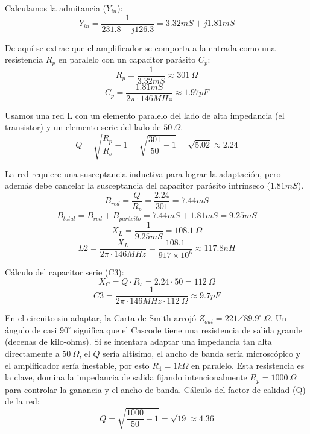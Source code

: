 \documentclass[11pt,a4paper,twoside]{report}
\begin{document}
	Calculamos la admitancia ($Y_{in}$):
	\begin{equation}
		Y_{in} = \frac{1}{231.8 - j126.3} = 3.32mS + j1.81mS
	\end{equation}
	
	De aquí se extrae que el amplificador se comporta a la entrada como una resistencia $R_p$ en paralelo con un capacitor parásito $C_p$:
	\begin{equation}
		R_p = \frac{1}{3.32mS} \approx 301 \ \Omega
	\end{equation}
	\begin{equation}
		C_p = \frac{1.81mS}{2 \pi \cdot 146 MHz} \approx 1.97 pF
	\end{equation}\newpage
	
	Usamos una red L con un elemento paralelo del lado de alta impedancia (el transistor) y un elemento serie del lado de $50 \ \Omega$.
	\begin{equation}
		Q = \sqrt{\frac{R_p}{R_s} - 1} = \sqrt{\frac{301}{50} - 1} = \sqrt{5.02} \approx 2.24
	\end{equation}
	
	La red requiere una susceptancia inductiva para lograr la adaptación, pero además debe cancelar la susceptancia del capacitor parásito intrínseco ($1.81 mS$).
	\begin{equation}
		B_{red} = \frac{Q}{R_p} = \frac{2.24}{301} = 7.44 mS
	\end{equation}
	\begin{equation}
		B_{total} = B_{red} + B_{parásito} = 7.44mS + 1.81 mS = 9.25mS
	\end{equation}
	\begin{equation}
		X_L = \frac{1}{9.25 mS} = 108.1 \ \Omega
	\end{equation}
	\begin{equation}
		L2 = \frac{X_L}{2 \pi \cdot 146MHz} = \frac{108.1}{917 \times 10^6} \approx 117.8 nH
	\end{equation}
	
	Cálculo del capacitor serie (C3):
	\begin{equation}
		X_C = Q \cdot R_s = 2.24 \cdot 50 = 112 \ \Omega
	\end{equation}
	\begin{equation}
		C3 = \frac{1}{2 \pi \cdot 146MHz \cdot 112 \ \Omega} \approx 9.7 pF
	\end{equation}
	
	En el circuito sin adaptar, la Carta de Smith arrojó $Z_{out} = 221 \angle 89.9^\circ \ \Omega$. Un ángulo de casi $90^\circ$ significa que el Cascode tiene una resistencia de salida grande (decenas de kilo-ohms). Si se intentara adaptar una impedancia tan alta directamente a $50 \ \Omega$, el $Q$ sería altísimo, el ancho de banda sería microscópico y el amplificador sería inestable, por esto $R_4 = 1k\Omega$ en paralelo. Esta resistencia es la clave, domina la impedancia de salida fijando intencionalmente $R_p = 1000 \ \Omega$ para controlar la ganancia y el ancho de banda.
	Cálculo del factor de calidad (Q) de la red:
	\begin{equation}
		Q = \sqrt{\frac{1000}{50} - 1} = \sqrt{19} \approx 4.36
	\end{equation}
	
\end{document}
